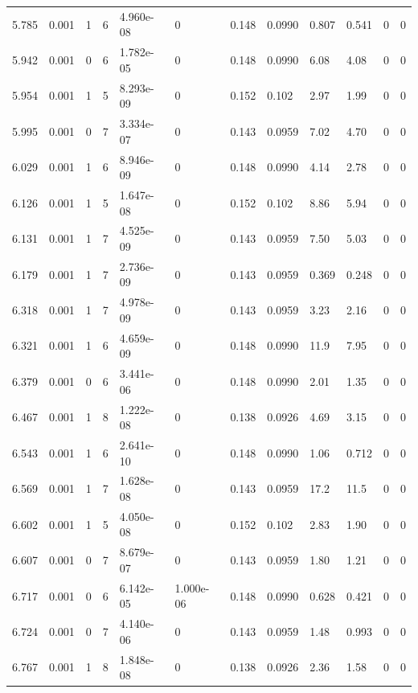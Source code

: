 \documentclass[preview]{standalone}
\begin{document}
{{{{\begin{tabular}{L{1.2cm}C{1.2cm} C{0.3cm}C{0.5cm} C{1.4cm}C{1.4cm} C{1.4cm}C{1.4cm} C{1.6cm}C{1.6cm} C{1.6cm}C{1.6cm}}
  5.785  &  0.001  & 1     &  6 &  4.960e-08  & 0  &  0.148&   0.0990& 0.807 & 0.541   &  0 & 0  \\ 
  5.942  &  0.001  & 0     &  6 &  1.782e-05  & 0  &  0.148&   0.0990& 6.08 & 4.08   &  0 & 0  \\ 
  5.954  &  0.001  & 1     &  5 &  8.293e-09  & 0  &  0.152&   0.102& 2.97 & 1.99   &  0 & 0  \\ 
  5.995  &  0.001  & 0     &  7 &  3.334e-07  & 0  &  0.143&   0.0959& 7.02 & 4.70   &  0 & 0  \\ 
  6.029  &  0.001  & 1     &  6 &  8.946e-09  & 0  &  0.148&   0.0990& 4.14 & 2.78   &  0 & 0  \\ 
  6.126  &  0.001  & 1     &  5 &  1.647e-08  & 0  &  0.152&   0.102& 8.86 & 5.94   &  0 & 0  \\ 
  6.131  &  0.001  & 1     &  7 &  4.525e-09  & 0  &  0.143&   0.0959& 7.50 & 5.03   &  0 & 0  \\ 
  6.179  &  0.001  & 1     &  7 &  2.736e-09  & 0  &  0.143&   0.0959& 0.369 & 0.248   &  0 & 0  \\ 
  6.318  &  0.001  & 1     &  7 &  4.978e-09  & 0  &  0.143&   0.0959& 3.23 & 2.16   &  0 & 0  \\ 
  6.321  &  0.001  & 1     &  6 &  4.659e-09  & 0  &  0.148&   0.0990& 11.9 & 7.95   &  0 & 0  \\ 
  6.379  &  0.001  & 0     &  6 &  3.441e-06  & 0  &  0.148&   0.0990& 2.01 & 1.35   &  0 & 0  \\ 
  6.467  &  0.001  & 1     &  8 &  1.222e-08  & 0  &  0.138&   0.0926& 4.69 & 3.15   &  0 & 0  \\ 
  6.543  &  0.001  & 1     &  6 &  2.641e-10  & 0  &  0.148&   0.0990& 1.06 & 0.712   &  0 & 0  \\ 
  6.569  &  0.001  & 1     &  7 &  1.628e-08  & 0  &  0.143&   0.0959& 17.2 & 11.5   &  0 & 0  \\ 
  6.602  &  0.001  & 1     &  5 &  4.050e-08  & 0  &  0.152&   0.102& 2.83 & 1.90   &  0 & 0  \\ 
  6.607  &  0.001  & 0     &  7 &  8.679e-07  & 0  &  0.143&   0.0959& 1.80 & 1.21   &  0 & 0  \\ 
  6.717  &  0.001  & 0     &  6 &  6.142e-05  & 1.000e-06  &  0.148&   0.0990& 0.628 & 0.421   &  0 & 0  \\ 
  6.724  &  0.001  & 0     &  7 &  4.140e-06  & 0  &  0.143&   0.0959& 1.48 & 0.993   &  0 & 0  \\ 
  6.767  &  0.001  & 1     &  8 &  1.848e-08  & 0  &  0.138&   0.0926& 2.36 & 1.58   &  0 & 0  \\ 

\end{tabular}}}}}
\end{document}
